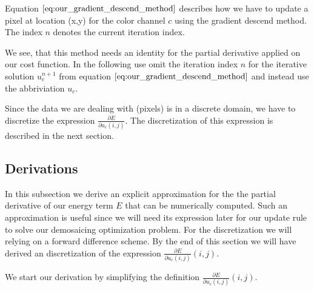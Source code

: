 \documentclass{paper}
\begin{document}
Equation $\ref{eq:our_gradient_descend_method}$ describes how we have to update a pixel at location (x,y) for the color channel $c$ using the gradient descend method. The index $n$ denotes the current iteration index. 

We see, that this method needs an identity for the partial derivative applied on our cost function. In the following use omit the iteration index $n$ for the iterative solution $u_{c}^{n+1}$ from equation $\ref{eq:our_gradient_descend_method}$ and instead use the abbriviation $u_{c}$.

Since the data we are dealing with (pixels) is in a discrete domain, we have to discretize the expression $\frac{\partial{E}}{\partial{u_{c} (i,j)}}$. The discretization of this expression is described in the next section.  

\subsection{Derivations}

In this subsection we derive an explicit approximation for the the partial derivative of our energy term $E$ that can be numerically computed. Such an approximation is useful since we will need its expression later for our update rule to solve our demosaicing optimization problem. For the discretization we will relying on a forward difference scheme. By the end of this section we will have derived an discretization of the expression $\frac{\partial{E}}{\partial{u_{c} (i,j)}}(i,j)$.

We start our derivation by simplifying the definition $\frac{\partial{E}}{\partial{u_{c} (i,j)}}(i,j)$.
\end{document}
